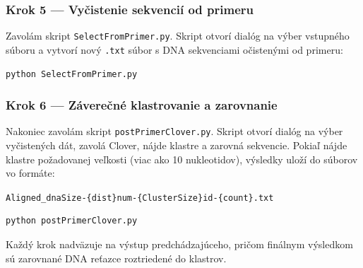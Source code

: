 \subsubsection*{Krok 5 — Vyčistenie sekvencií od primeru}
Zavolám skript \texttt{SelectFromPrimer.py}. Skript otvorí dialóg na výber vstupného súboru a vytvorí nový \texttt{.txt} súbor s DNA sekvenciami očistenými od primeru:
\begin{verbatim}
python SelectFromPrimer.py
\end{verbatim}

\subsubsection*{Krok 6 — Záverečné klastrovanie a zarovnanie}
Nakoniec zavolám skript \texttt{postPrimerClover.py}. Skript otvorí dialóg na výber vyčistených dát, zavolá Clover, nájde klastre a zarovná sekvencie. Pokiaľ nájde klastre požadovanej veľkosti (viac ako 10 nukleotidov), výsledky uloží do súborov vo formáte:
\begin{center}
\texttt{Aligned\_dnaSize-\{dist\}num-\{ClusterSize\}id-\{count\}.txt}
\end{center}
\begin{verbatim}
python postPrimerClover.py
\end{verbatim}

Každý krok nadväzuje na výstup predchádzajúceho, pričom finálnym výsledkom sú zarovnané DNA reťazce roztriedené do klastrov.
